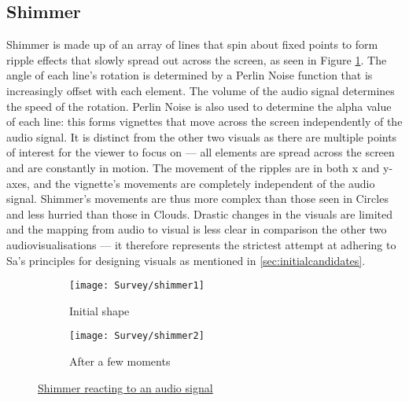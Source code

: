 \documentclass[../initial_thesis.tex]{subfiles}
\begin{document}
\subsection{Shimmer}
Shimmer is made up of an array of lines that spin about fixed points to form ripple effects that slowly spread out across the screen, as seen in Figure \ref{fig:shimmer1}. The angle of each line's rotation is determined by a Perlin Noise function that is increasingly offset with each element. The volume of the audio signal determines the speed of the rotation. Perlin Noise is also used to determine the alpha value of each line: this forms vignettes that move across the screen independently of the audio signal. It is distinct from the other two visuals as there are multiple points of interest for the viewer to focus on --- all elements are spread across the screen and are constantly in motion. The movement of the ripples are in both x and y-axes, and the vignette's movements are completely independent of the audio signal. Shimmer's movements are thus more complex than those seen in Circles and less hurried than those in Clouds. Drastic changes in the visuals are limited and the mapping from audio to visual is less clear in comparison the other two audiovisualisations --- it therefore represents the strictest attempt at adhering to Sa's principles for designing visuals as mentioned in \ref{sec:initialcandidates}. 

\begin{figure}
  \begin{subfigure}{0.5\textwidth}
    \texttt{[image: Survey/shimmer1]}
    \caption{Initial shape}
  \end{subfigure} 
  \begin{subfigure}{0.5\textwidth}
    \texttt{[image: Survey/shimmer2]}
    \caption{After a few moments}
  \end{subfigure}
  \caption{\href{https://vimeo.com/327859350}{Shimmer reacting to an audio signal}}
  \label{fig:shimmer1}
\end{figure}
\end{document}
